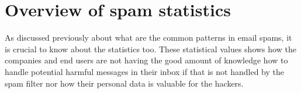 ﻿\section{Overview of spam statistics}
As discussed previously about what are the common patterns in email spams, it is crucial to know about the statistics too.
These statistical values shows how the companies and end users are not having the good amount of knowledge how to handle potential harmful messages in their inbox if that is not handled by the spam filter nor how their personal data is valuable for the hackers.

